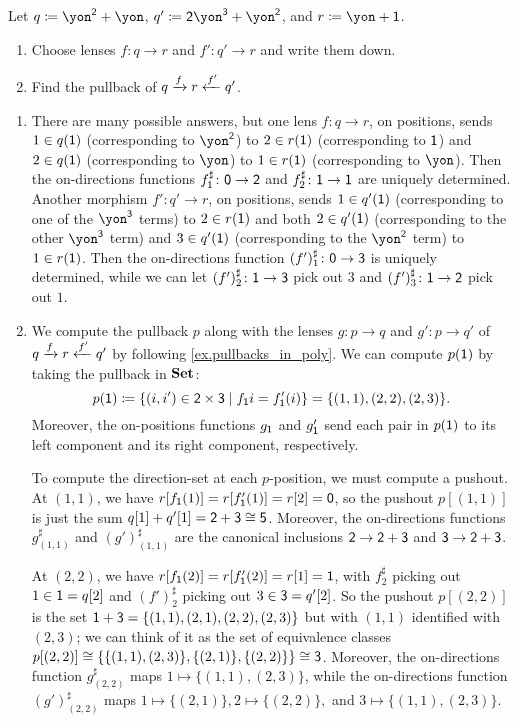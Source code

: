 \documentclass[Book-Poly]{subfiles}
\begin{document}
\begin{exercise}
Let $q\coloneqq \yon^\2+\yon$, $q'\coloneqq\2\yon^\3+\yon^\2$, and $r\coloneq\yon+\1$.
\begin{enumerate}
	\item Choose lenses $f\colon q\to r$ and $f'\colon q'\to r$ and write them down.
	\item Find the pullback of $q\xrightarrow{f} r\xleftarrow{f'} q'$.
\qedhere
\end{enumerate}
\begin{solution}
\begin{enumerate}
    \item There are many possible answers, but one lens $f \colon q \to r$, on positions, sends $1 \in q(\textsf{1})$ (corresponding to $\yon^\2$) to $2 \in r(\textsf{1})$ (corresponding to $\textsf{1}$) and $2 \in q(\textsf{1})$ (corresponding to $\yon$) to $1 \in r(\textsf{1})$ (corresponding to $\yon$).
    Then the on-directions functions $f^\sharp_{\textsf{1}} \colon \textsf{0} \to \textsf{2}$ and $f^\sharp_2 \colon \textsf{1} \to \textsf{1}$ are uniquely determined.
    Another morphism $f' \colon q' \to r$, on positions, sends $1 \in q'(\textsf{1})$ (corresponding to one of the $\yon^\3$ terms) to $2 \in r(\textsf{1})$ and both $2 \in q'(\textsf{1})$ (corresponding to the other $\yon^\3$ term) and $3 \in q'(\textsf{1})$ (corresponding to the $\yon^\2$ term) to $1 \in r(\textsf{1})$.
    Then the on-directions function $(f')^\sharp_1 \colon \textsf{0} \to \textsf{3}$ is uniquely determined, while we can let $(f')^\sharp_2 \colon \textsf{1} \to \textsf{3}$ pick out $3$ and $(f')^\sharp_3 \colon \textsf{1} \to \textsf{2}$ pick out $1$.

    \item We compute the pullback $p$ along with the lenses $g \colon p \to q$ and $g' \colon p \to q'$ of $q\xrightarrow{f} r\xleftarrow{f'} q'$ by following \cref{ex.pullbacks_in_poly}.
    We can compute $p(\textsf{1})$ by taking the pullback in $\mathbf{Set}$:
    \[
        p(\textsf{1}) \coloneqq \{(i, i') \in \textsf{2} \times \textsf{3} \mid f_{\textsf{1}}i = f'_{\textsf{1}}(i)\} = \{(1,1), (2,2), (2,3)\}.
    \]
    Moreover, the on-positions functions $g_{\textsf{1}}$ and $g'_{\textsf{1}}$ send each pair in $p(\textsf{1})$ to its left component and its right component, respectively.

    To compute the direction-set at each $p$-position, we must compute a pushout.
    At $(1,1)$, we have $r[f_{\textsf{1}}(1)] = r[f'_{\textsf{1}}(1)] = r[2] = \textsf{0}$, so the pushout $p[(1,1)]$ is just the sum $q[1] + q'[1] = \textsf{2} + \textsf{3} \cong \textsf{5}$.
    Moreover, the on-directions functions $g^\sharp_{(1,1)}$ and $(g')^\sharp_{(1,1)}$ are the canonical inclusions $\textsf{2} \to \textsf{2} + \textsf{3}$ and $\textsf{3} \to \textsf{2} + \textsf{3}$.

    At $(2,2)$, we have $r[f_{\textsf{1}}(2)] = r[f'_{\textsf{1}}(2)] = r[1] = \textsf{1}$, with $f^\sharp_2$ picking out $1 \in \textsf{1} = q[2]$ and $(f')^\sharp_2$ picking out $3 \in \textsf{3} = q'[2]$.
    So the pushout $p[(2,2)]$ is the set $\textsf{1} + \textsf{3} = \{(1,1), (2,1), (2,2), (2,3)\}$ but with $(1,1)$ identified with $(2,3)$; we can think of it as the set of equivalence classes $p[(2,2)] \cong \{\{(1,1), (2,3)\}, \{(2,1)\}, \{(2,2)\}\} \cong \textsf{3}$.
    Moreover, the on-directions function $g^\sharp_{(2,2)}$ maps $1 \mapsto \{(1,1), (2,3)\}$, while the on-directions function $(g')^\sharp_{(2,2)}$ maps $1 \mapsto \{(2,1)\}, 2 \mapsto \{(2,2)\},$ and $3 \mapsto \{(1,1), (2,3)\}$.


\end{enumerate}
\end{solution}
\end{exercise}
\end{document}
